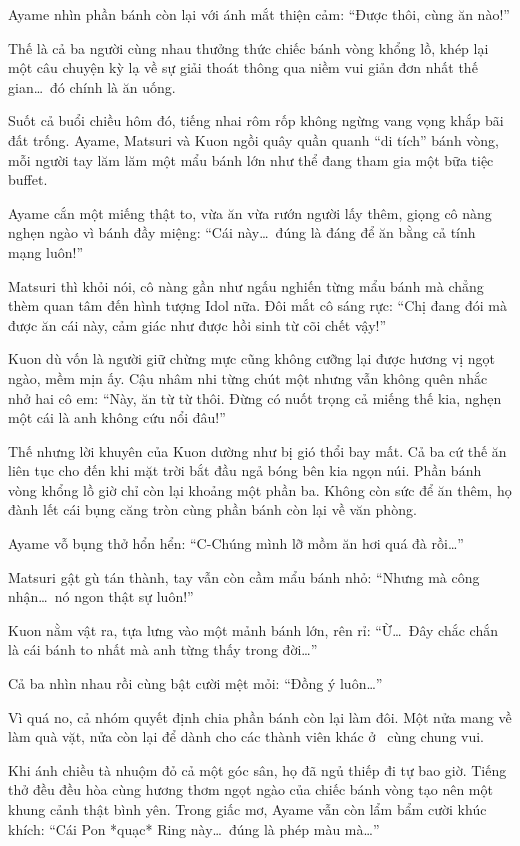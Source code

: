 \documentclass[../main.tex]{subfiles}
\begin{document}
Ayame nhìn phần bánh còn lại với ánh mắt thiện cảm: ``Được thôi, cùng ăn nào!''

Thế là cả ba người cùng nhau thưởng thức chiếc bánh vòng khổng lồ, khép lại một câu chuyện kỳ lạ về sự giải thoát thông qua niềm vui giản đơn nhất thế gian\dots\ đó chính là ăn uống.

\omk

Suốt cả buổi chiều hôm đó, tiếng nhai rôm rốp không ngừng vang vọng khắp bãi đất trống. Ayame, Matsuri và Kuon ngồi quây quần quanh ``di tích'' bánh vòng, mỗi người tay lăm lăm một mẩu bánh lớn như thể đang tham gia một bữa tiệc buffet.

Ayame cắn một miếng thật to, vừa ăn vừa rướn người lấy thêm, giọng cô nàng nghẹn ngào vì bánh đầy miệng: ``Cái này\dots\ đúng là đáng để ăn bằng cả tính mạng luôn!''

Matsuri thì khỏi nói, cô nàng gần như ngấu nghiến từng mẩu bánh mà chẳng thèm quan tâm đến hình tượng Idol nữa. Đôi mắt cô sáng rực: ``Chị đang đói mà được ăn cái này, cảm giác như được hồi sinh từ cõi chết vậy!''

Kuon dù vốn là người giữ chừng mực cũng không cưỡng lại được hương vị ngọt ngào, mềm mịn ấy. Cậu nhâm nhi từng chút một nhưng vẫn không quên nhắc nhở hai cô em: ``Này, ăn từ từ thôi. Đừng có nuốt trọng cả miếng thế kia, nghẹn một cái là anh không cứu nổi đâu!''

Thế nhưng lời khuyên của Kuon dường như bị gió thổi bay mất. Cả ba cứ thế ăn liên tục cho đến khi mặt trời bắt đầu ngả bóng bên kia ngọn núi. Phần bánh vòng khổng lồ giờ chỉ còn lại khoảng một phần ba. Không còn sức để ăn thêm, họ đành lết cái bụng căng tròn cùng phần bánh còn lại về văn phòng.


Ayame vỗ bụng thở hổn hển: ``C-Chúng mình lỡ mồm ăn hơi quá đà rồi\dots''

Matsuri gật gù tán thành, tay vẫn còn cầm mẩu bánh nhỏ: ``Nhưng mà công nhận\dots\ nó ngon thật sự luôn!''

Kuon nằm vật ra, tựa lưng vào một mảnh bánh lớn, rên rỉ: ``Ừ\dots\ Đây chắc chắn là cái bánh to nhất mà anh từng thấy trong đời\dots''

Cả ba nhìn nhau rồi cùng bật cười mệt mỏi: ``Đồng ý luôn\dots''

Vì quá no, cả nhóm quyết định chia phần bánh còn lại làm đôi. Một nửa mang về làm quà vặt, nửa còn lại để dành cho các thành viên khác ở \hll\ cùng chung vui.

Khi ánh chiều tà nhuộm đỏ cả một góc sân, họ đã ngủ thiếp đi tự bao giờ. Tiếng thở đều đều hòa cùng hương thơm ngọt ngào của chiếc bánh vòng tạo nên một khung cảnh thật bình yên. Trong giấc mơ, Ayame vẫn còn lẩm bẩm cười khúc khích: ``Cái Pon *quạc* Ring này\dots\ đúng là phép màu mà\dots''
\end{document}
